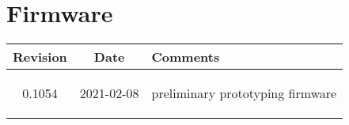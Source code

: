 \section{Firmware}
\begin{tabularx}{\textwidth}{|c|c|X|}
    \hline
    Revision & Date & Comments\\
    \hline\hline
    \hypertarget{fwrev}{0.1054} & 2021-02-08 & preliminary prototyping firmware\\
    \hline
\end{tabularx}